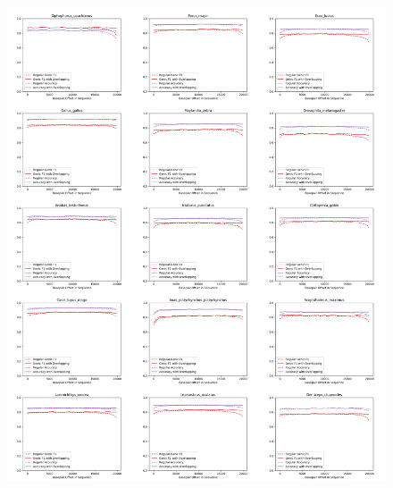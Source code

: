 \documentclass{article}
\begin{document}
\begin{figure}[!h]
\centerline{\includegraphics[width=\overlapscale\textwidth]{images/overlapping/montage_animals4}}
\end{figure}
\end{document}
